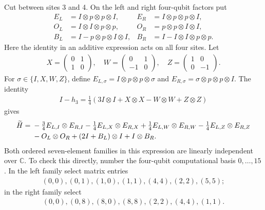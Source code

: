 \documentclass{article}
\begin{document}
Cut between sites 3 and 4. On the left and right four-qubit factors put
\begin{align}
 E_L&=I\otimes p\otimes p\otimes I,&
 E_R&=I\otimes p\otimes p\otimes I,
    \label{eq:ff_rank_factors_E}\\
 O_L&=I\otimes I\otimes p\otimes p,&
 O_R&=p\otimes p\otimes I\otimes I,
    \label{eq:ff_rank_factors_O}\\
 B_L&=I-p\otimes p\otimes I\otimes I,&
 B_R&=I-I\otimes I\otimes p\otimes p.
    \label{eq:ff_rank_factors_B}
\end{align}
Here the identity in an additive expression acts on all four sites.
Let
\begin{align}
 X=\begin{pmatrix}0&1\\1&0\end{pmatrix},\quad
 W=\begin{pmatrix}0&1\\-1&0\end{pmatrix},\quad
 Z=\begin{pmatrix}1&0\\0&-1\end{pmatrix}.
    \label{eq:ff_rank_two_qubit_matrices}
\end{align}
For $\sigma\in\{I,X,W,Z\}$, define
$E_{L,\sigma}=I\otimes p\otimes p\otimes\sigma$ and
$E_{R,\sigma}=\sigma\otimes p\otimes p\otimes I$.
The identity
\begin{align}
 I-h_3=\tfrac14(3I\otimes I+X\otimes X-W\otimes W+Z\otimes Z)
    \label{eq:ff_rank_singlet_complement}
\end{align}
gives
\begin{align}
 \widetilde H={}&-\tfrac34E_{L,I}\otimes E_{R,I}
 -\tfrac14E_{L,X}\otimes E_{R,X}
 +\tfrac14E_{L,W}\otimes E_{R,W}
 -\tfrac14E_{L,Z}\otimes E_{R,Z}\notag\\
 &-O_L\otimes O_R+(2I+B_L)\otimes I+I\otimes B_R.
 \label{eq:ff_rank_seven}
\end{align}
Both ordered seven-element families in this expression are linearly
independent over $\mathbb C$. To check this directly, number the
four-qubit computational basis $0,\ldots,15$. In the left family select
matrix entries
\begin{align}
 (0,0),(0,1),(1,0),(1,1),(4,4),(2,2),(5,5);
    \label{eq:ff_rank_left_entries}
\end{align}
in the right family select
\begin{align}
 (0,0),(0,8),(8,0),(8,8),(2,2),(4,4),(1,1).
    \label{eq:ff_rank_right_entries}
\end{align}
\end{document}

